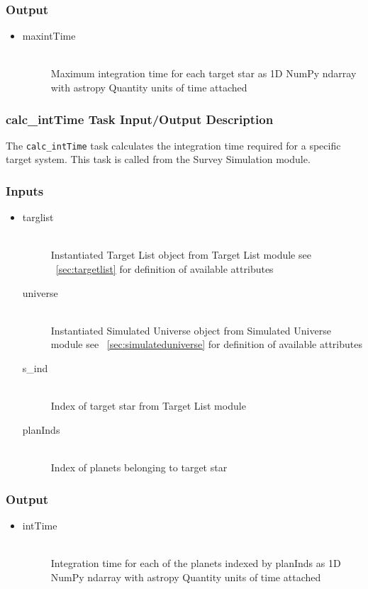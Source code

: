 \documentclass[cleanfoot]{asme2ej}
\begin{document}
\subsubsection*{Output}
\begin{itemize}
    \item
    \begin{description}
        \item[maxintTime] \hfill \\
        Maximum integration time for each target star as 1D NumPy ndarray with astropy Quantity units of time attached
    \end{description}
\end{itemize}

\subsubsection{calc\_intTime Task Input/Output Description} \label{sec:calcintTimetask}
The \verb+calc_intTime+ task calculates the integration time required for a specific target system.  This task is called from the Survey Simulation module.
\subsubsection*{Inputs}
\begin{itemize}
    \item 
    \begin{description}
        \item[targlist] \hfill \\
        Instantiated Target List object from Target List module see ~\ref{sec:targetlist} for definition of available attributes
        \item[universe] \hfill \\
        Instantiated Simulated Universe object from Simulated Universe module see ~\ref{sec:simulateduniverse} for definition of available attributes
        \item[s\_ind] \hfill \\
        Index of target star from Target List module
        \item[planInds] \hfill \\
        Index of planets belonging to target star
    \end{description}
\end{itemize}

\subsubsection*{Output}
\begin{itemize}
    \item 
    \begin{description}
        \item[intTime] \hfill \\
        Integration time for each of the planets indexed by planInds as 1D NumPy ndarray with astropy Quantity units of time attached 
    \end{description}
\end{itemize}
\end{document}
